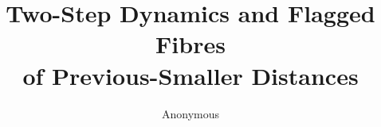 \documentclass[a4paper,10pt]{amsart}
\title[Previous-smaller distance feedback]{Two-Step Dynamics and Flagged Fibres\protect\\ of Previous-Smaller Distances}
\author{Anonymous}
\date{}
\begin{document}
\begin{abstract}

\end{abstract}
\maketitle






\end{document}
